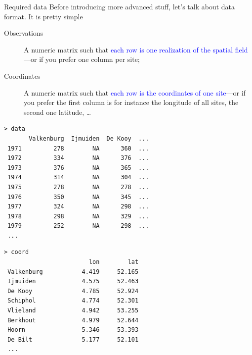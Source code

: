 \documentclass[blackslide,style=simple]{powerdot}
\theoremstyle{plain}%
\theoremstyle{definition}
\theoremstyle{remark}
\begin{document}
\begin{slide}[toc=Data format,method=direct]{Required data}
  Before introducing more advanced stuff, let's talk about data
  format. It is pretty simple
  \begin{description}
  \item[Observations] A numeric matrix such that \textcolor{blue}{each
      row is one realization of the spatial field}---or if you prefer
    one column per site;
  \item[Coordinates] A numeric matrix such that \textcolor{blue}{each
      row is the coordinates of one site}---or if you prefer the first
    column is for instance the longitude of all sites, the second one
    latitude, \ldots
  \end{description}
{\tiny
  \begin{minipage}[l]{.49\linewidth}
\begin{verbatim}
> data
       Valkenburg  Ijmuiden  De Kooy  ...
 1971         278        NA      360  ...  
 1972         334        NA      376  ...  
 1973         376        NA      365  ...  
 1974         314        NA      304  ...  
 1975         278        NA      278  ...  
 1976         350        NA      345  ...  
 1977         324        NA      298  ...  
 1978         298        NA      329  ...  
 1979         252        NA      298  ...  
 ...
\end{verbatim}%
  \end{minipage}%
  \begin{minipage}[r]{.49\linewidth}
\begin{verbatim}
> coord
                        lon        lat 
 Valkenburg           4.419     52.165 
 Ijmuiden             4.575     52.463 
 De Kooy              4.785     52.924 
 Schiphol             4.774     52.301 
 Vlieland             4.942     53.255 
 Berkhout             4.979     52.644 
 Hoorn                5.346     53.393 
 De Bilt              5.177     52.101 
 ...
\end{verbatim}
  \end{minipage}  
}
\end{slide}
\end{document}
